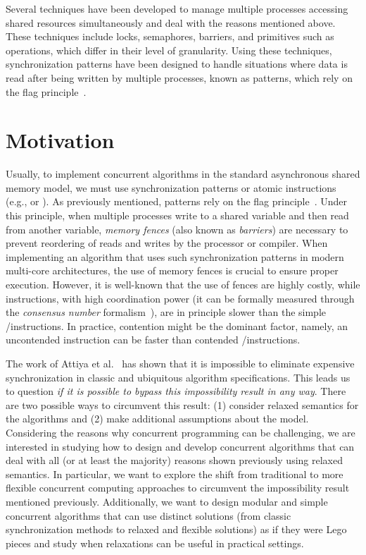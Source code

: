 Several techniques have been developed to manage multiple processes accessing shared resources simultaneously and deal with the reasons mentioned above. These techniques include locks, semaphores, barriers, and primitives such as \RMW operations, which differ in their level of granularity. Using these techniques, synchronization patterns have been designed to handle situations where data is read after being written by multiple processes, known as \RAW patterns, which rely on the flag principle~\cite{DBLP_books_daglib_0020056}.


\section{\label{section:Motivation}Motivation}

Usually, to implement concurrent algorithms in the standard asynchronous shared memory model, we must use \RAW synchronization patterns or atomic \RMW instructions (e.g., \CAS or \TAS). As previously mentioned, \RAW patterns rely on the flag principle~\cite{DBLP_books_daglib_0020056}. Under this principle, when multiple processes write to a shared variable and then read from another variable, \textit{memory fences} (also known as \textit{barriers}) are necessary to prevent reordering of reads and writes by the processor or compiler. When implementing an algorithm that uses such synchronization patterns in modern multi-core architectures, the use of memory fences is crucial to ensure proper execution. However, it is well-known that the use of fences are highly costly, while \RMW instructions, with high coordination power (it can be formally measured through the \textit{consensus number} formalism~\cite{DBLP_journals_toplas_Herlihy91}), are in principle slower than the simple \R/\W instructions. In practice, contention might be the dominant factor, namely, an uncontended \RMW instruction can be faster than contended \R/\W instructions.

The work of Attiya et al.~\cite{DBLP_conf_popl_AttiyaGHKMV11} has shown that it is impossible to eliminate expensive synchronization in classic and ubiquitous algorithm specifications. This leads us to question \textit{if it is possible to bypass this impossibility result in any way}. There are two possible ways to circumvent this result: (1) consider relaxed semantics for the algorithms and (2) make additional assumptions about the model. Considering the reasons why concurrent programming can be challenging, we are interested in studying how to design and develop concurrent algorithms that can deal with all (or at least the majority) reasons shown previously using relaxed semantics. In particular, we want to explore the shift from traditional to more flexible concurrent computing approaches to circumvent the impossibility result mentioned previously. Additionally, we want to design modular and simple concurrent algorithms that can use distinct solutions (from classic synchronization methods to relaxed and flexible solutions) as if they were Lego pieces and study when relaxations can be useful in practical settings.

